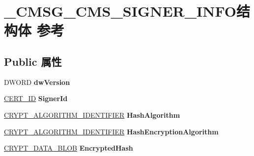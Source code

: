 \hypertarget{struct___c_m_s_g___c_m_s___s_i_g_n_e_r___i_n_f_o}{}\section{\+\_\+\+C\+M\+S\+G\+\_\+\+C\+M\+S\+\_\+\+S\+I\+G\+N\+E\+R\+\_\+\+I\+N\+F\+O结构体 参考}
\label{struct___c_m_s_g___c_m_s___s_i_g_n_e_r___i_n_f_o}
\subsection*{Public 属性}
\begin{DoxyCompactItemize}
\item 
\mbox{\label{struct___c_m_s_g___c_m_s___s_i_g_n_e_r___i_n_f_o_a59d9df810d522b65cae80535ae0f5f3a}} 
D\+W\+O\+RD {\bfseries dw\+Version}
\item 
\mbox{\label{struct___c_m_s_g___c_m_s___s_i_g_n_e_r___i_n_f_o_abfd0b6c070e8bab04b3e8351212a90e3}} 
\hyperlink{struct___c_e_r_t___i_d}{C\+E\+R\+T\+\_\+\+ID} {\bfseries Signer\+Id}
\item 
\mbox{\label{struct___c_m_s_g___c_m_s___s_i_g_n_e_r___i_n_f_o_a2d4865f1fc2050719d32d8476df0106f}} 
\hyperlink{struct___c_r_y_p_t___a_l_g_o_r_i_t_h_m___i_d_e_n_t_i_f_i_e_r}{C\+R\+Y\+P\+T\+\_\+\+A\+L\+G\+O\+R\+I\+T\+H\+M\+\_\+\+I\+D\+E\+N\+T\+I\+F\+I\+ER} {\bfseries Hash\+Algorithm}
\item 
\mbox{\label{struct___c_m_s_g___c_m_s___s_i_g_n_e_r___i_n_f_o_a00becb7fde188bdef3e16b1d99d38f7c}} 
\hyperlink{struct___c_r_y_p_t___a_l_g_o_r_i_t_h_m___i_d_e_n_t_i_f_i_e_r}{C\+R\+Y\+P\+T\+\_\+\+A\+L\+G\+O\+R\+I\+T\+H\+M\+\_\+\+I\+D\+E\+N\+T\+I\+F\+I\+ER} {\bfseries Hash\+Encryption\+Algorithm}
\item 
\mbox{\label{struct___c_m_s_g___c_m_s___s_i_g_n_e_r___i_n_f_o_a71964a1ea754185897259e86f9ff198f}} 
\hyperlink{struct___c_r_y_p_t_o_a_p_i___b_l_o_b}{C\+R\+Y\+P\+T\+\_\+\+D\+A\+T\+A\+\_\+\+B\+L\+OB} {\bfseries Encrypted\+Hash}

\end{DoxyCompactItemize}
